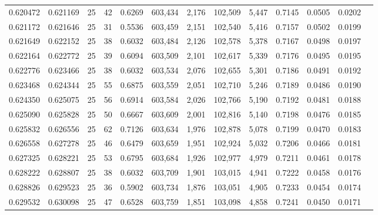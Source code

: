 \begin{tabular}{rrrrrrrrrrrrr}
0.620472 & 0.621169 &    25 &  42 &                                     0.6269 & 603,434 &   2,176 & 102,509 &   5,447 & 0.7145 & 0.0505 & 0.0202 \\
0.621172 & 0.621646 &    25 &  31 &                                     0.5536 & 603,459 &   2,151 & 102,540 &   5,416 & 0.7157 & 0.0502 & 0.0199 \\
0.621649 & 0.622152 &    25 &  38 &                                     0.6032 & 603,484 &   2,126 & 102,578 &   5,378 & 0.7167 & 0.0498 & 0.0197 \\
0.622164 & 0.622772 &    25 &  39 &                                     0.6094 & 603,509 &   2,101 & 102,617 &   5,339 & 0.7176 & 0.0495 & 0.0195 \\
0.622776 & 0.623466 &    25 &  38 &                                     0.6032 & 603,534 &   2,076 & 102,655 &   5,301 & 0.7186 & 0.0491 & 0.0192 \\
0.623468 & 0.624344 &    25 &  55 &                                     0.6875 & 603,559 &   2,051 & 102,710 &   5,246 & 0.7189 & 0.0486 & 0.0190 \\
0.624350 & 0.625075 &    25 &  56 &                                     0.6914 & 603,584 &   2,026 & 102,766 &   5,190 & 0.7192 & 0.0481 & 0.0188 \\
0.625090 & 0.625828 &    25 &  50 &                                     0.6667 & 603,609 &   2,001 & 102,816 &   5,140 & 0.7198 & 0.0476 & 0.0185 \\
0.625832 & 0.626556 &    25 &  62 &                                     0.7126 & 603,634 &   1,976 & 102,878 &   5,078 & 0.7199 & 0.0470 & 0.0183 \\
0.626558 & 0.627278 &    25 &  46 &                                     0.6479 & 603,659 &   1,951 & 102,924 &   5,032 & 0.7206 & 0.0466 & 0.0181 \\
0.627325 & 0.628221 &    25 &  53 &                                     0.6795 & 603,684 &   1,926 & 102,977 &   4,979 & 0.7211 & 0.0461 & 0.0178 \\
0.628222 & 0.628807 &    25 &  38 &                                     0.6032 & 603,709 &   1,901 & 103,015 &   4,941 & 0.7222 & 0.0458 & 0.0176 \\
0.628826 & 0.629523 &    25 &  36 &                                     0.5902 & 603,734 &   1,876 & 103,051 &   4,905 & 0.7233 & 0.0454 & 0.0174 \\
0.629532 & 0.630098 &    25 &  47 &                                     0.6528 & 603,759 &   1,851 & 103,098 &   4,858 & 0.7241 & 0.0450 & 0.0171 \\

\end{tabular}
